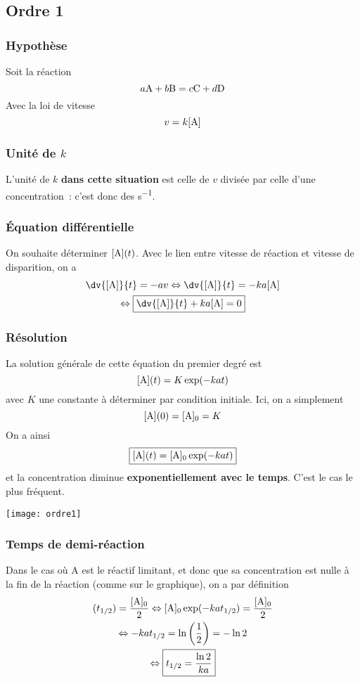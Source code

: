 \documentclass[../main/main.tex]{subfiles}
\begin{document}
\subsection{Ordre 1}

\subsubsection{Hypothèse}
Soit la réaction
\[a{\rm A} + b{\rm B}
        =
  c{\rm C} +d{\rm D}
\]
Avec la loi de vitesse
\[v = k [{\rm A}]\]

\subsubsection{Unité de $k$}

L'unité de $k$ \textbf{dans cette situation} est celle de $v$ divisée par celle
d'une concentration~: c'est donc des \si{s^{-1}}.

\subsubsection{Équation différentielle}
On souhaite déterminer $[{\rm A}](t)$. Avec le lien entre vitesse de réaction et
vitesse de disparition, on a
\begin{gather*}
    \dv{[{\rm A}]}{t} = -av \Leftrightarrow \dv{[{\rm A}]}{t} = -ka[{\rm A}]\\
    \Leftrightarrow
    \boxed{\dv{[{\rm A}]}{t} + ka[{\rm A}] = 0}
\end{gather*}

\subsubsection{Résolution}
La solution générale de cette équation du premier degré est
\[[{\rm A}](t) = K\exp(-kat)\]
avec $K$ une constante à déterminer par condition initiale. Ici, on a simplement
\[[{\rm A}](0) = [{\rm A}]_0 = K\]
On a ainsi
\[\boxed{[{\rm A}](t) = [{\rm A}]_0\exp(-kat)}\]
et la concentration diminue \textbf{exponentiellement avec le temps}. C'est le
cas le plus fréquent.

\begin{center}
    \texttt{[image: ordre1]}
\end{center}

\subsubsection{Temps de demi-réaction}
Dans le cas où A est le réactif limitant, et donc que sa concentration est nulle
à la fin de la réaction (comme sur le graphique), on a par définition
\begin{gather*}
    [{\rm A}](t_{1/2}) = \frac{[{\rm A}]_0}{2}
    \Leftrightarrow
    [{\rm A}]_0\exp(-kat_{1/2}) = \frac{[{\rm A}]_0}{2}\\
    \Leftrightarrow
    -kat_{1/2} = \ln \left( \frac{1}{2} \right) = -\ln 2\\
    \Leftrightarrow
    \boxed{t_{1/2} = \frac{\ln 2}{ka}}
\end{gather*}
\end{document}
